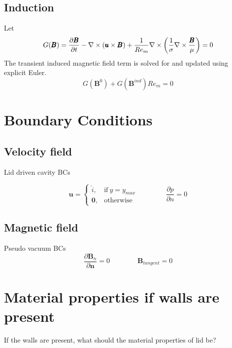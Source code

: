 \documentclass[11pt]{article}
\begin{document}
\subsection{Induction}
Let
\begin{equation}
  \label{eq:ind}
  G(\pmb{B})
  =
  \frac{\partial \pmb{B}}{\partial t} 
  -
  \nabla \times (\pmb{u} \times \pmb{B})
  + \\
  \frac{1}{Re_m}
  \nabla \times
  \left(
  \frac{1}{\sigma}
  \nabla \times
  \frac{\pmb{B}}{\mu}
  \right)
  =
  0
\end{equation}
The transient induced magnetic field term is solved for and updated using explicit Euler.
\begin{equation}
  G(\pmb{B}^0) + G(\pmb{B}^{ind}) Re_m = 0
\end{equation}

\section{Boundary Conditions}

\subsection{Velocity field}
Lid driven cavity BCs

\begin{equation}
	\pmb{u} = 
	\begin{cases}
      \hat{i}, & \text{if}\ y=y_{max} \\
      \pmb{0}, & \text{otherwise}
    \end{cases}
    \qquad \qquad
    \frac{\partial p}{\partial n} = 0
\end{equation}


\subsection{Magnetic field}
Pseudo vacuum BCs
\begin{equation}
	\frac{\partial \pmb{B}_{n}}{\partial \pmb{n}} = 0
	\qquad \qquad
	\pmb{B}_{tangent} = 0
\end{equation}

\section{Material properties if walls are present}
If the walls are present, what should the material properties of lid be?
\end{document}
